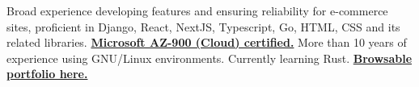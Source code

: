


\begin{cvpubs}

  \cvpub
    {
      \begin{cvlist}
  \item { Broad experience developing features and ensuring reliability for e-commerce sites, proficient in Django, React, NextJS, Typescript, Go, HTML, CSS and its related libraries. \textbf{\href{https://www.credly.com/badges/17608a52-2cb7-4268-a907-613459559911/public_url}{Microsoft AZ-900 (Cloud) certified.}} More than 10 years of experience using GNU/Linux environments. Currently learning Rust. \textbf{\href{https://eduardozepeda.dev/\#portfolio}{Browsable portfolio here.}}}  
      \end{cvlist}
    }\vspace{-1pt}
\end{cvpubs}

